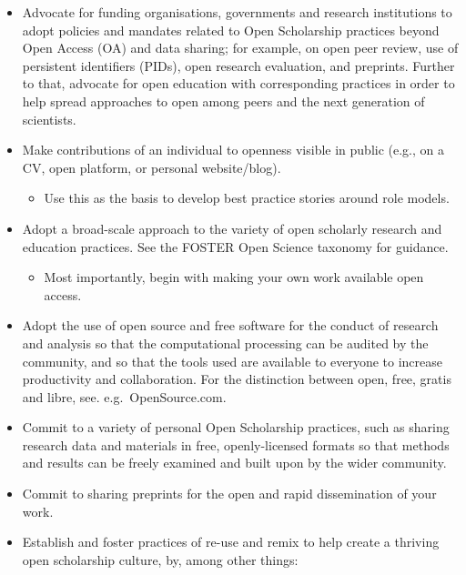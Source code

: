 \documentclass[]{article}
\providecommand{\tightlist}{%
  \setlength{\itemsep}{0pt}\setlength{\parskip}{0pt}}
\begin{document}
\begin{itemize}
\item
  Advocate for funding organisations, governments and research
  institutions to adopt policies and mandates related to Open
  Scholarship practices beyond Open Access (OA) and data sharing; for
  example, on open peer review, use of persistent identifiers (PIDs),
  open research evaluation, and preprints. Further to that, advocate for
  open education with corresponding practices in order to help spread
  approaches to open among peers and the next generation of scientists.
\item
  Make contributions of an individual to openness visible in public
  (e.g., on a CV, open platform, or personal website/blog).

  \begin{itemize}
  \tightlist
  \item
    Use this as the basis to develop best practice stories around role
    models.
  \end{itemize}
\item
  Adopt a broad-scale approach to the variety of open scholarly research
  and education practices. See the FOSTER Open Science taxonomy for
  guidance.

  \begin{itemize}
  \tightlist
  \item
    Most importantly, begin with making your own work available open
    access.
  \end{itemize}
\item
  Adopt the use of open source and free software for the conduct of
  research and analysis so that the computational processing can be
  audited by the community, and so that the tools used are available to
  everyone to increase productivity and collaboration. For the
  distinction between open, free, gratis and libre, see.
  e.g.~OpenSource.com.
\item
  Commit to a variety of personal Open Scholarship practices, such as
  sharing research data and materials in free, openly-licensed formats
  so that methods and results can be freely examined and built upon by
  the wider community.
\item
  Commit to sharing preprints for the open and rapid dissemination of
  your work.
\item
  Establish and foster practices of re-use and remix to help create a
  thriving open scholarship culture, by, among other things:


\end{itemize}
\end{document}
